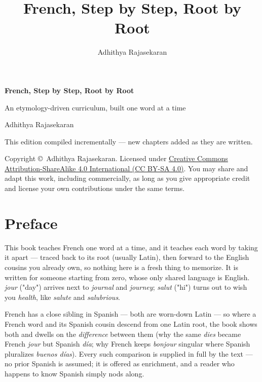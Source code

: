 \documentclass[11pt,twoside]{book}
\title{\Huge French, Step by Step, Root by Root}
\author{Adhithya Rajasekaran}
\date{}
\begin{document}
\frontmatter

\begin{titlepage}
  \centering
  \vspace*{3cm}
  {\Huge\bfseries French, Step by Step, Root by Root\par}
  \vspace{1cm}
  {\Large An etymology-driven curriculum, built one word at a time\par}
  \vspace{1.5cm}
  {\large Adhithya Rajasekaran\par}
  \vfill
  {\large This edition compiled incrementally --- new chapters added as they
  are written.\par}
  \vspace{2cm}
  {\normalsize
    Copyright \copyright\ Adhithya Rajasekaran. Licensed under
    \href{https://creativecommons.org/licenses/by-sa/4.0/}%
    {Creative Commons Attribution-ShareAlike 4.0 International (CC BY-SA 4.0)}.
    You may share and adapt this work, including commercially, as long as
    you give appropriate credit and license your own contributions under
    the same terms.\par
  }
\end{titlepage}

\chapter*{Preface}

This book teaches French one word at a time, and it teaches each word by taking
it apart --- traced back to its root (usually Latin), then forward to the
English cousins you already own, so nothing here is a fresh thing to memorize.
It is written for someone starting from zero, whose only shared language is
English. \emph{jour} ("day") arrives next to \emph{journal} and
\emph{journey}; \emph{salut} ("hi") turns out to wish you \emph{health}, like
\emph{salute} and \emph{salubrious}.

French has a close sibling in Spanish --- both are worn-down Latin --- so where
a French word and its Spanish cousin descend from one Latin root, the book
shows both and dwells on the \emph{difference} between them (why the same
\emph{dies} became French \emph{jour} but Spanish \emph{d\'{i}a}; why French
keeps \emph{bonjour} singular where Spanish pluralizes \emph{buenos d\'{i}as}).
Every such comparison is supplied in full by the text --- no prior Spanish is
assumed; it is offered as enrichment, and a reader who happens to know Spanish
simply nods along.
\end{document}
